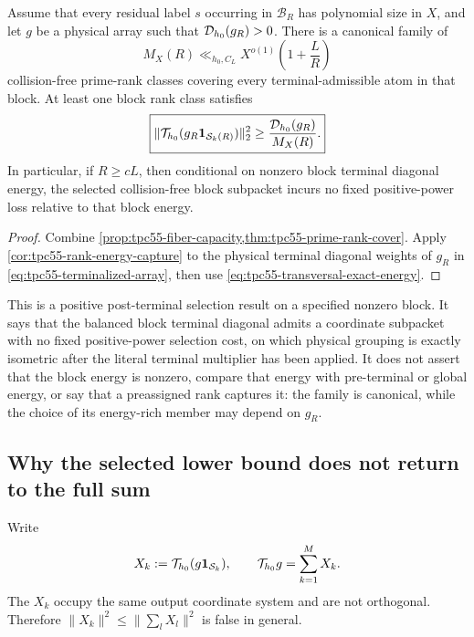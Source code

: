\begin{theorem}
\label{thm:tpc55-balanced-transversal}
Assume that every residual label \(s\) occurring in \(\mathcal B_R\) has
polynomial size in \(X\), and let \(g\) be a physical array such that
\(\mathcal D_{h_0}(g_R)>0\).  There is a canonical family of
\begin{equation}
 M_X(R)\ll_{h_0,C_L}X^{o(1)}\left(1+\frac LR\right)
 \label{eq:tpc55-number-of-transversals}
\end{equation}
collision-free prime-rank classes covering every terminal-admissible atom in
that block.  At least one block rank class satisfies
\begin{equation}
 \boxed{
 \|\mathcal T_{h_0}(g_R\mathbf 1_{\mathcal S_k(R)})\|_2^2
 \ge\frac{\mathcal D_{h_0}(g_R)}{M_X(R)}.}
 \label{eq:tpc55-balanced-transversal-energy}
\end{equation}
In particular, if \(R\ge cL\), then conditional on nonzero block terminal
diagonal energy, the selected collision-free block subpacket incurs no
fixed positive-power loss relative to that block energy.
\end{theorem}

\begin{proof}
Combine \cref{prop:tpc55-fiber-capacity,thm:tpc55-prime-rank-cover}.
Apply \cref{cor:tpc55-rank-energy-capture} to the physical terminal
diagonal weights of \(g_R\) in \eqref{eq:tpc55-terminalized-array}, then use
\eqref{eq:tpc55-transversal-exact-energy}.
\end{proof}

This is a positive post-terminal selection result on a specified nonzero
block.  It says that the balanced block terminal diagonal admits a
coordinate subpacket with no fixed positive-power selection cost, on which
physical grouping is exactly isometric after the literal terminal
multiplier has been applied.  It does not assert that the block energy is
nonzero, compare that energy with pre-terminal or global energy, or say
that a preassigned rank captures it: the family is canonical, while the
choice of its energy-rich member may depend on \(g_R\).

\subsection{Why the selected lower bound does not return to the full sum}

Write
\begin{equation}
 X_k:=\mathcal T_{h_0}(g\mathbf 1_{\mathcal S_k}),
 \qquad
 \mathcal T_{h_0}g=\sum_{k=1}^{M}X_k.
 \label{eq:tpc55-rank-output-sum}
\end{equation}
The \(X_k\) occupy the same output coordinate system and are not
orthogonal.  Therefore \(\|X_k\|^2\le\|\sum_lX_l\|^2\) is false in
general.

